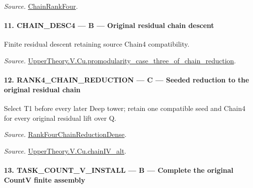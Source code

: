 \documentclass[11pt,a4paper]{article}
\numberwithin{equation}{section}
\theoremstyle{remark}\newtheorem{remark}[theorem]{Remark}
\begin{document}
\emph{Source.} \href{https://github.com/CocoSgt/riemann-hypothesis-lean/blob/7cbf7a0c32fca1badf05931879a37c3f8a2b03b4/src/Development/AutomorphicArithmetic/AutomorphicVarieties/ModularityArgument/ThresholdArguments/DenseThresholdCases/PromodularityCaseThree.lean#L26-L32}{ChainRankFour}.



\paragraph{11. CHAIN\_\allowbreak DESC4 — B — Original residual chain descent}

Finite residual descent retaining source Chain4 compatibility.

\emph{Source.} \href{https://github.com/CocoSgt/riemann-hypothesis-lean/blob/7cbf7a0c32fca1badf05931879a37c3f8a2b03b4/src/Development/AutomorphicArithmetic/AutomorphicVarieties/ModularityArgument/ThresholdArguments/DenseThresholdCases/PromodularityCaseThreeOfLemmas.lean#L131-L153}{UpperTheory.V.Cu.promodularity\_\allowbreak case\_\allowbreak three\_\allowbreak of\_\allowbreak chain\_\allowbreak reduction}.



\paragraph{12. RANK4\_\allowbreak CHAIN\_\allowbreak REDUCTION — C — Seeded reduction to the original residual chain}

Select T1 before every later Deep tower; retain one compatible seed and Chain4 for every original residual lift over Q.

\emph{Source.} \href{https://github.com/CocoSgt/riemann-hypothesis-lean/blob/7cbf7a0c32fca1badf05931879a37c3f8a2b03b4/src/Development/AutomorphicArithmetic/AutomorphicVarieties/ModularityArgument/ThresholdArguments/DenseThresholdCases/PromodularityCaseThree.lean#L33-L39}{RankFourChainReductionDense}.

\emph{Source.} \href{https://github.com/CocoSgt/riemann-hypothesis-lean/blob/7cbf7a0c32fca1badf05931879a37c3f8a2b03b4/src/Development/AutomorphicArithmetic/AutomorphicVarieties/ModularityArgument/ThresholdArguments/DenseThresholdCases/CuPChainIV.lean#L16-L82}{UpperTheory.V.Cu.chainIV\_\allowbreak alt}.



\paragraph{13. TASK\_\allowbreak COUNT\_\allowbreak V\_\allowbreak INSTALL — B — Complete the original CountV finite assembly}
\end{document}
